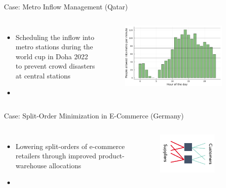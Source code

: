 \documentclass[aspectratio=1610,12pt]{beamer}
\begin{document}
\begin{frame}[fragile]{Case: Metro Inflow Management (Qatar)}
	\begin{columns}[onlytextwidth]
		\center
			\begin{itemize}
				\item Scheduling the inflow into metro stations during the world cup in Doha 2022 to prevent crowd disasters at central stations
				\item {}
            \end{itemize}
    	\center
    		\begin{figure}
    	    \includegraphics[width=0.9\textwidth]{images/metro_example.png}
    		\end{figure}
    \end{columns}
\end{frame}

\begin{frame}[fragile]{Case: Split-Order Minimization in E-Commerce (Germany)}
	\begin{columns}[onlytextwidth]
		\center
			\begin{itemize}
				\item Lowering split-orders of e-commerce retailers through improved product-warehouse allocations
				\item {}
	    		\end{itemize}
    	\center
    		\begin{figure}
    			\includegraphics[width=0.75\textwidth]{images/optimierung_zuordnung.pdf}
    		\end{figure}
    \end{columns}
\end{frame}
\end{document}
